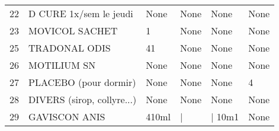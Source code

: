 \begin{tabular}{llllll}
22 &              D CURE 1x/sem le jeudi &   None &  None &    None &  None \\
23 &                      MOVICOL SACHET &      1 &  None &    None &  None \\
25 &                       TRADONAL ODIS &     41 &  None &    None &  None \\
26 &                         MOTILIUM SN &   None &  None &    None &  None \\
27 &               PLACEBO (pour dormir) &   None &  None &    None &     4 \\
28 &          DIVERS (sirop, collyre...) &   None &  None &    None &  None \\
29 &                       GAVISCON ANIS &  410ml &     | &  | 10m1 &  None \\
\bottomrule
\end{tabular}
